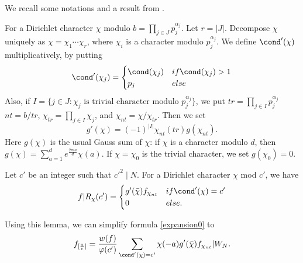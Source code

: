 \documentclass [11pt, proquest] {uwthesis}[2015/03/03]
\begin{document}
We recall some notations and a result from \cite{delaunay2002thesis}.
\begin{Definition}\cite[Definition III.2.4]{delaunay2002thesis}
For a Dirichlet character $\chi$ modulo $b = \prod_{j \in J} p_j^{\alpha_j}$. Let $r = |J|$. Decompose $\chi$ uniquely as 
$\chi = \chi_1 \cdots \chi_r$, where $\chi_i$ is a character modulo $p_j^{\alpha_j}$.  We define $\cond'(\chi)$ multiplicatively, by putting 
\begin{equation} \label{modified conductor}
	\cond'(\chi_j) = \begin{cases} \cond(\chi_j) & if \cond(\chi_j) > 1 \\ p_j & else \end{cases}
\end{equation}
Also, if $I = \{j \in J : \chi_j \mbox{ is trivial character modulo } p_j^{\alpha_j}\}$, we put $tr = \prod_{j \in I} p_j^{\alpha_j} $
$nt = b/tr$,  $\chi_{tr} = \prod_{j \in I} \chi_j$, and $\chi_{nt} = \chi/\chi_{tr}$. Then we set
\begin{equation} \label{modified gauss sum}
	g'(\chi) = (-1)^{|I|} \chi_{nt}(tr) g(\chi_{nt}). 
\end{equation}
Here $g(\chi)$ is the usual Gauss sum of $\chi$: if $\chi$ is a character modulo $d$, then $g(\chi) = \sum_{a=1}^{d} e^{\frac{2\pi i a}{d}} \chi(a)$. If $\chi = \chi_0$ is the trivial character, we set $g(\chi_0) = 0$. 
\end{Definition}


\begin{Lemma}\cite[Prop 2.6]{delaunay2002thesis} \label{lemma of delaunay}
Let $c'$ be an integer such that $c'^2 \mid N$. For a Dirichlet character $\chi$ mod $c'$, we have
$$f|R_{\chi}(c') = \begin{cases} g'(\bar{\chi}) f_{\chi_{nt}} & if \cond'(\chi) = c' \\ 0 & else.  \end{cases}$$
\end{Lemma}

Using this lemma, we can simplify formula \ref{expansion0} to 
\begin{equation} \label{expansion01}
	f_{[\frac{a}{c}]}= \frac{w(f) }{\varphi(c')}\sum_{\cond'(\chi) = c'} \chi(-a)g'(\bar{\chi}) f_{\chi_{nt}} | W_N. 
\end{equation}
\end{document}
